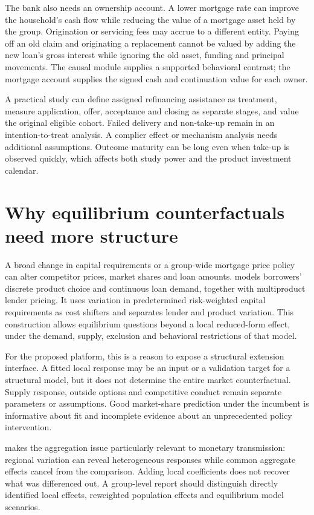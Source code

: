 The bank also needs an ownership account. A lower mortgage rate can improve
the household's cash flow while reducing the value of a mortgage asset
held by the group. Origination or servicing fees may accrue to a different
entity. Paying off an old claim and originating a replacement cannot be
valued by adding the new loan's gross interest while ignoring the old
asset, funding and principal movements. The causal module supplies a
supported behavioral contrast; the mortgage account supplies the signed
cash and continuation value for each owner.

A practical study can define assigned refinancing assistance as treatment,
measure application, offer, acceptance and closing as separate stages,
and value the original eligible cohort. Failed delivery and non-take-up
remain in an intention-to-treat analysis. A complier effect or mechanism
analysis needs additional assumptions. Outcome maturity can be long even
when take-up is observed quickly, which affects both study power and the
product investment calendar.

\section{Why equilibrium counterfactuals need more structure}
A broad change in capital requirements or a group-wide mortgage price
policy can alter competitor prices, market shares and loan amounts.
\citet{benetton2021} models borrowers' discrete product choice and
continuous loan demand, together with multiproduct lender pricing. It
uses variation in predetermined risk-weighted capital requirements as
cost shifters and separates lender and product variation. This construction
allows equilibrium questions beyond a local reduced-form effect, under
the demand, supply, exclusion and behavioral restrictions of that model.

For the proposed platform, this is a reason to expose a structural extension
interface. A fitted local response may be an input or a validation target
for a structural model, but it does not determine the entire market
counterfactual. Supply response, outside options and competitive conduct
remain separate parameters or assumptions. Good market-share prediction
under the incumbent is informative about fit and incomplete evidence about
an unprecedented policy intervention.

\citet{beraja2019} makes the aggregation issue particularly relevant to
monetary transmission: regional variation can reveal heterogeneous responses
while common aggregate effects cancel from the comparison. Adding local
coefficients does not recover what was differenced out. A group-level
report should distinguish directly identified local effects, reweighted
population effects and equilibrium model scenarios.

